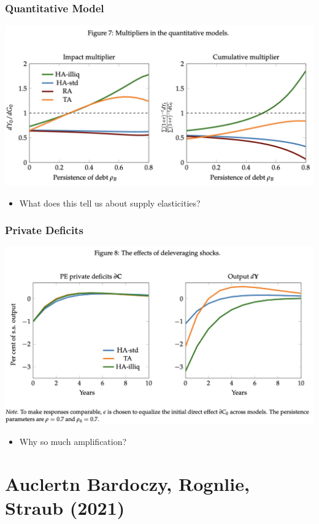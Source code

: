 \documentclass[english,xcolor=svgnames]{beamer}
\begin{document}


\begin{frame}
    \frametitle{Quantitative Model}
    \includegraphics[scale=0.5]{figures/ARSFIG7.png}
    \begin{itemize}
    	\item What does this tell us about supply elasticities?
    \end{itemize}
\end{frame}

\begin{frame}
    \frametitle{Private Deficits}
    \includegraphics[scale=0.5]{figures/ARSFIG8.png}
    \begin{itemize}
    	\item Why so much amplification?
    \end{itemize}
\end{frame}

\section{Auclertn Bardoczy, Rognlie, Straub (2021)}
\end{document}
